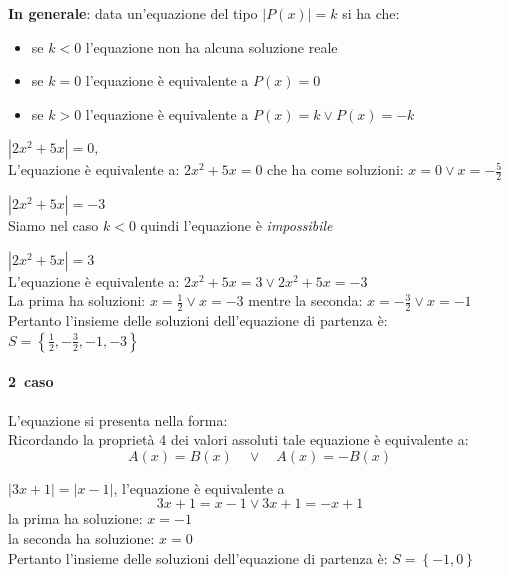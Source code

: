 \noindent \textbf{In generale}: data un'equazione del tipo $|P(x)|=k$ si ha che:
\begin{itemize}[nosep]
 \item se $k < 0$  l'equazione non ha alcuna soluzione reale
 \item se $k = 0$  l'equazione è equivalente a  $P(x) = 0$
 \item se $k > 0$   l'equazione è equivalente a  $P(x)=k \vee P(x)=-k$
\end{itemize}

\begin{esempio} 
\(|2x^2+5x|=0,\) \\[4pt]
L'equazione è equivalente a: \(2x^2+5x=0\)
che ha come soluzioni:
\(x=0 \vee x=-\frac{5}{2}\)
\end{esempio}

\begin{esempio} 
\(|2x^2+5x|=-3\)\\[4pt] Siamo nel caso $k < 0$ 
quindi l'equazione è \emph{impossibile}
\end{esempio}
        
\begin{esempio} 
\(|2x^2+5x|=3\)\\[4pt] L'equazione è equivalente a:
\(2x^2+5x=3 \vee 2x^2+5x=-3\) \\[4pt]
La prima ha soluzioni: $x=\frac{1}{2} \vee x=-3$ mentre la seconda: $x=-\frac{3}{2} \vee x=-1$\\[4pt]
Pertanto l'insieme delle soluzioni dell'equazione di partenza è: 
$S=\left\lbrace \frac{1}{2},-\frac{3}{2},-1,-3\right\rbrace $
\end{esempio}

\paragraph{2\textdegree~caso} L'equazione si presenta nella forma:  
\\[4pt]
Ricordando la proprietà 4 dei valori assoluti tale equazione è equivalente a:
$$A(x)=B(x) \quad\vee\quad  A(x)=-B(x)$$

\begin{esempio} $|3x+1|=|x-1|$, l'equazione è equivalente a
$$3x+1=x-1 \vee 3x+1=-x+1$$
la prima ha soluzione: $x=-1$\\
la seconda ha soluzione: $x=0$\\
Pertanto l'insieme delle soluzioni dell'equazione di partenza è: 
$S=\left\lbrace -1,0 \right\rbrace $ 
\end{esempio}
                

